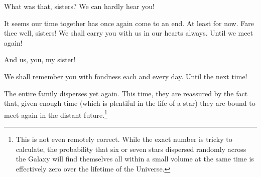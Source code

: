 \documentclass[main.tex]{subfiles}
\begin{document}
\Lacedaemon What was that, sisters?  We can hardly hear you!

\Celaeno It seems our time together has once again come to an end.  At least for now.  Fare thee well, sisters!  We shall carry you with us in our hearts always.  Until we meet again!

\Maia And us, you, my sister!

\Merope We shall remember you with fondness each and every day.  Until the next time!  

The entire family disperses yet again.  This time, they are reassured by the fact that, given enough time (which is plentiful in the life of a star) they are bound to meet again in the distant future.\footnote{This is not even remotely correct.  While the exact number is tricky to calculate, the probability that six or seven stars dispersed randomly across the Galaxy will find themselves all within a small volume at the same time is effectively zero over the lifetime of the Universe.}
\end{document}
